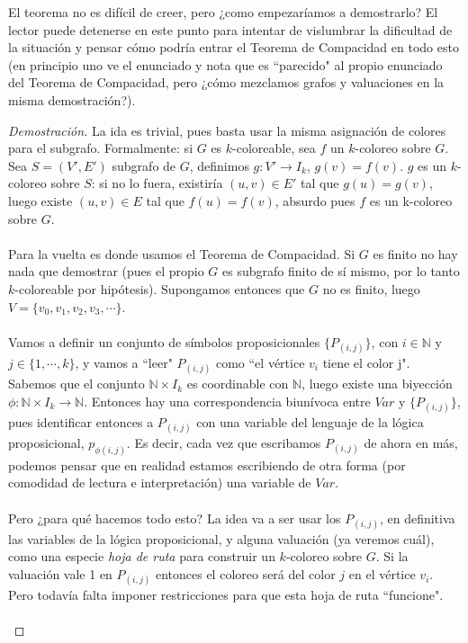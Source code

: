 \documentclass[12pt]{article}
\newcommand{\N}{\mathbb{N}}
\newenvironment{dem}{\begin{proof}[Demostración]}{\end{proof}}
\begin{document}
El teorema no es difícil de creer, pero ¿como empezaríamos a demostrarlo? El lector puede detenerse en este punto para intentar de vislumbrar la dificultad de la situación y pensar cómo podría entrar el Teorema de Compacidad en todo esto (en principio uno ve el enunciado y nota que es ``parecido" al propio enunciado del Teorema de Compacidad, pero ¿cómo mezclamos grafos y valuaciones en la misma demostración?).
\begin{dem}
La ida es trivial, pues basta usar la misma asignación de colores para el subgrafo. Formalmente: si $G$ es $k$-coloreable, sea $f$ un $k$-coloreo sobre $G$. Sea $S = (V',E')$ subgrafo de $G$, definimos $g: V' \rightarrow I_k$, $g(v) = f(v)$.  $g$ es un $k$-coloreo sobre $S$: si no lo fuera, existiría $(u,v) \in E'$ tal que $g(u) = g(v)$, luego existe $(u,v) \in E$ tal que $f(u) = f(v)$, absurdo pues $f$ es un k-coloreo sobre $G$.
\\ \\
Para la vuelta es donde usamos el Teorema de Compacidad. Si $G$ es finito no hay nada que demostrar (pues el propio $G$ es subgrafo finito de sí mismo, por lo tanto $k$-coloreable por hipótesis). Supongamos entonces que $G$ no es finito, luego $V = \{v_0, v_1, v_2, v_3, \cdots \}$. \\ \\ Vamos a definir un conjunto de símbolos proposicionales $\{ P_{(i,j)} \}$, con $i\in\mathbb{N}$ y $j \in \{1, \cdots, k\}$, y vamos a ``leer" $P_{(i,j)}$ como ``el vértice $v_i$ tiene el color j". Sabemos que el conjunto $\N \times I_k$ es coordinable con $\N$, luego existe una biyección $\phi : \N \times I_k \rightarrow \N$. Entonces hay una correspondencia biunívoca entre $Var$ y $\{P_{(i,j)}\}$, pues identificar entonces a $P_{(i,j)}$ con una variable del lenguaje de la lógica proposicional, $p_{\phi(i,j)}$. Es decir, cada vez que escribamos $P_{(i,j)}$ de ahora en más, podemos pensar que en realidad estamos escribiendo de otra forma (por comodidad de lectura e interpretación) una variable de $Var$.
\\ \\ Pero ¿para qué hacemos todo esto? La idea va a ser usar los $P_{(i,j)}$, en definitiva las variables de la lógica proposicional, y alguna valuación (ya veremos cuál), como una especie \textit{hoja de ruta} para construir un $k$-coloreo sobre $G$. Si la valuación vale 1 en $P_{(i,j)}$ entonces el coloreo será del color $j$ en el vértice $v_i$. Pero todavía falta imponer restricciones para que esta hoja de ruta ``funcione".
\\ \\

\end{dem}
\end{document}
